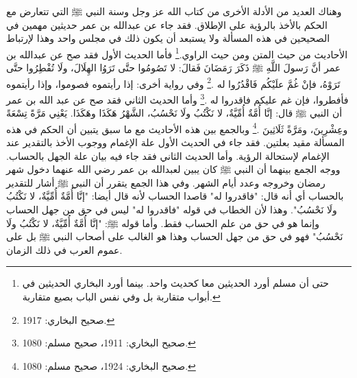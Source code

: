 وهناك العديد من الأدلة الأخرى من كتاب الله عز وجل وسنة النبي ﷺ التي تتعارض مع الحكم بالأخذ بالرؤية على الإطلاق. فقد جاء عن عبدالله بن عمر حديثين مهمين في الصحيحين في هذه المسألة ولا يستبعد أن يكون ذلك في مجلس واحد وهذا لإرتباط الأحاديث من حيث المتن ومن حيث الراوي.\footnote{حتى أن مسلم أورد الحديثين معا كحديث واحد. بينما أورد البخاري الحديثين في أبواب متقاربة بل وفي نفس الباب بصيع متقاربة.} فأما الحديث الأول فقد صح عن عبدالله بن عمر أنَّ رَسولَ اللَّهِ ﷺ ذَكَرَ رَمَضَانَ فَقالَ: لا تَصُومُوا حتَّى تَرَوُا الهِلَالَ، ولَا تُفْطِرُوا حتَّى تَرَوْهُ، فإنْ غُمَّ علَيْكُم فَاقْدُرُوا له \href{https://shamela.ws/book/1284/1256#p6}{\faExternalLink} \cite{bukhari}.\footnote{صحيح البخاري: 1917.} وفي رواية أخرى: إذا رأيتموه فصوموا، وإذا رأيتموه فأفطروا، فإن غم عليكم فاقدروا له \href{https://shamela.ws/book/1284/1254#p1}{\faExternalLink} \cite{bukhari} \href{https://shamela.ws/book/1727/2430#p3}{\faExternalLink} \cite{muslim}.\footnote{صحيح البخاري: 1911، صحيح مسلم: 1080.} وأما الحديث الثاني فقد صح عن عبد الله بن عمر أن النبي ﷺ قال: إنَّا أُمَّةٌ أُمِّيَّةٌ، لا نَكْتُبُ ولَا نَحْسُبُ، الشَّهْرُ هَكَذَا وهَكَذَا. يَعْنِي مَرَّةً تِسْعَةً وعِشْرِينَ، ومَرَّةً ثَلَاثِينَ \href{https://shamela.ws/book/1284/1259#p3}{\faExternalLink} \cite{bukhari} \href{https://shamela.ws/book/1727/2443#p2}{\faExternalLink} \cite{muslim}.\footnote{صحيح البخاري: 1924، صحيح مسلم: 1080.} وبالجمع بين هذه الأحاديث مع ما سبق يتبين أن الحكم في هذه المسألة مقيد بعلتين.  فقد جاء في الحديث الأول علة الإغمام ووجوب الأخذ بالتقدير عند الإغمام لإستحالة الرؤية. وأما الحديث الثاني فقد جاء فيه بيان علة الجهل بالحساب. ووجه الجمع بينهما أن النبي ﷺ كان يبين لعبدالله بن عمر رضي الله عنهما دخول شهر رمضان وخروجه وعدد أيام الشهر. وفي هذا الجمع يتقرر أن النبي ﷺ أشار للتقدير بالحساب أي أنه قال: "فاقدروا له" قاصدا الحساب لأنه قال أيضا: "إنَّا أُمَّةٌ أُمِّيَّةٌ، لا نَكْتُبُ ولَا نَحْسُبُ". وهذا لأن الخطاب في قوله "فاقدروا له" ليس في حق من جهل الحساب وإنما هو في حق من علم الحساب فقط. وأما قوله ﷺ: "إنَّا أُمَّةٌ أُمِّيَّةٌ، لا نَكْتُبُ ولَا نَحْسُبُ" فهو في حق من جهل الحساب وهذا هو الغالب على أصحاب النبي ﷺ بل على عموم العرب في ذلك الزمان.

\vspace{1em}
\vspace{1em}

